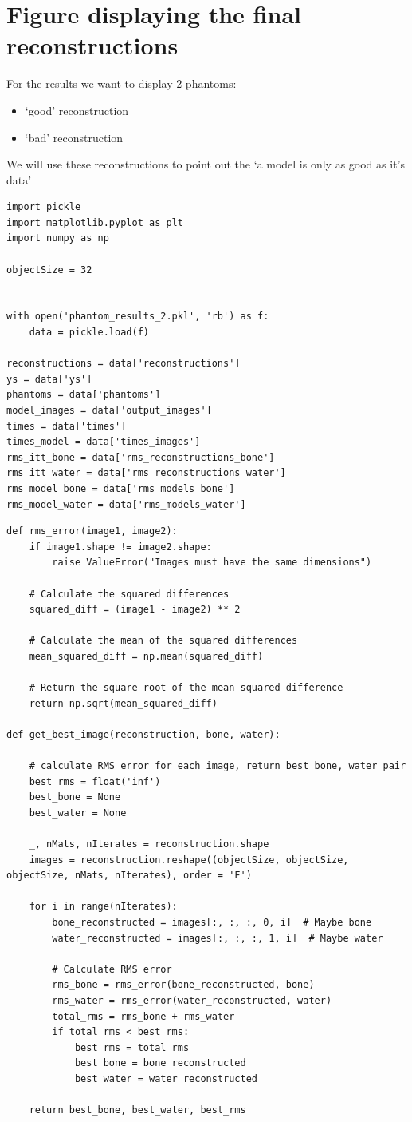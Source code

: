 \section{Figure displaying the final reconstructions}

For the results we want to display 2 phantoms:

\begin{itemize}
\item `good' reconstruction
\item `bad' reconstruction
\end{itemize}

We will use these reconstructions to point out the `a model is only as good as it's data'

\begin{verbatim}
import pickle 
import matplotlib.pyplot as plt
import numpy as np

objectSize = 32


with open('phantom_results_2.pkl', 'rb') as f:
    data = pickle.load(f)

reconstructions = data['reconstructions']
ys = data['ys']
phantoms = data['phantoms']
model_images = data['output_images']
times = data['times']
times_model = data['times_images']
rms_itt_bone = data['rms_reconstructions_bone']
rms_itt_water = data['rms_reconstructions_water']
rms_model_bone = data['rms_models_bone']
rms_model_water = data['rms_models_water']
\end{verbatim}

\begin{verbatim}
def rms_error(image1, image2):
    if image1.shape != image2.shape:
        raise ValueError("Images must have the same dimensions")

    # Calculate the squared differences
    squared_diff = (image1 - image2) ** 2

    # Calculate the mean of the squared differences
    mean_squared_diff = np.mean(squared_diff)

    # Return the square root of the mean squared difference
    return np.sqrt(mean_squared_diff)

def get_best_image(reconstruction, bone, water):

    # calculate RMS error for each image, return best bone, water pair
    best_rms = float('inf')
    best_bone = None
    best_water = None

    _, nMats, nIterates = reconstruction.shape
    images = reconstruction.reshape((objectSize, objectSize, objectSize, nMats, nIterates), order = 'F')    
    
    for i in range(nIterates):
        bone_reconstructed = images[:, :, :, 0, i]  # Maybe bone
        water_reconstructed = images[:, :, :, 1, i]  # Maybe water

        # Calculate RMS error
        rms_bone = rms_error(bone_reconstructed, bone)
        rms_water = rms_error(water_reconstructed, water)
        total_rms = rms_bone + rms_water
        if total_rms < best_rms:
            best_rms = total_rms
            best_bone = bone_reconstructed
            best_water = water_reconstructed
    
    return best_bone, best_water, best_rms
\end{verbatim}

